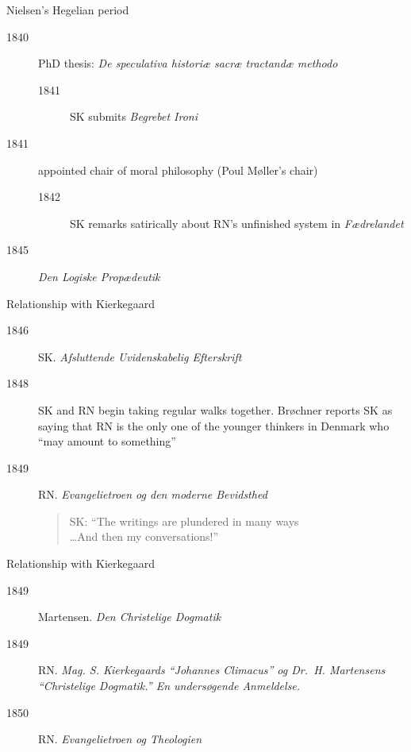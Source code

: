 \documentclass[ignorenonframetext, ]{beamer}
\begin{document}
\begin{frame}{Nielsen's Hegelian period}

  \begin{description}
  \item[1840] PhD thesis: \textit{De speculativa historiæ sacræ
      tractandæ methodo}
    \begin{description}
    \item[1841] SK submits \emph{Begrebet Ironi}
    \end{description}
  \item[1841] appointed chair of moral philosophy (Poul Møller's
    chair)
    \begin{description}
    \item[1842] SK remarks satirically about RN's unfinished system in
      \emph{Fædrelandet}
    \end{description}
  \item[1845] \textit{Den Logiske Propædeutik}
  \end{description}
  
\end{frame}

\begin{frame}{Relationship with Kierkegaard}

  \noindent \begin{description}
  \item[1846] SK. \emph{Afsluttende Uvidenskabelig Efterskrift}
    \item[1848] SK and RN begin taking regular walks
      together. Brøchner reports SK as saying that RN is the only one
      of the younger thinkers in Denmark who ``may amount to
      something''
  \item[1849] RN. \emph{Evangelietroen og den moderne Bevidsthed}
    \newline \medskip \begin{quote} SK: ``The writings are plundered
      in many ways \\ \dots And then my conversations!''
    \end{quote}
  \end{description}
    
\end{frame}

\begin{frame}{Relationship with Kierkegaard}


  \begin{description}
  \item[1849] Martensen. \emph{Den Christelige Dogmatik}
  \item[1849] RN. \emph{Mag. S. Kierkegaards ``Johannes Climacus'' og
      Dr.~H.  Martensens ``Christelige Dogmatik.'' En undersøgende
      Anmeldelse.}
   \item[1850] RN. \emph{Evangelietroen og Theologien}
   \end{description}

\end{frame}
\end{document}
